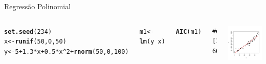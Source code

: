 \documentclass{beamer}\usepackage[]{graphicx}\usepackage[]{color}
\makeatletter
\newcommand{\hlnum}[1]{\textcolor[rgb]{0.686,0.059,0.569}{#1}}%
\newcommand{\hlopt}[1]{\textcolor[rgb]{0,0,0}{#1}}%
\newcommand{\hlstd}[1]{\textcolor[rgb]{0.345,0.345,0.345}{#1}}%
\newcommand{\hlkwb}[1]{\textcolor[rgb]{0.69,0.353,0.396}{#1}}%
\newcommand{\hlkwd}[1]{\textcolor[rgb]{0.737,0.353,0.396}{\textbf{#1}}}%
\newenvironment{kframe}{%
 \def\at@end@of@kframe{}%
 \ifinner\ifhmode%
  \def\at@end@of@kframe{\end{minipage}}%
  \begin{minipage}{\columnwidth}%
 \fi\fi%
 \def\FrameCommand##1{\hskip\@totalleftmargin \hskip-\fboxsep
 \colorbox{shadecolor}{##1}\hskip-\fboxsep
     \hskip-\linewidth \hskip-\@totalleftmargin \hskip\columnwidth}%
 \MakeFramed {\advance\hsize-\width
   \@totalleftmargin\z@ \linewidth\hsize
   \@setminipage}}%
 {\par\unskip\endMakeFramed%
 \at@end@of@kframe}
\newenvironment{knitrout}{}{} %
\renewenvironment{knitrout}{\setlength{\topsep}{0mm}}{}
\makeatother
\begin{document}
\begin{frame}[fragile]{Regressão Polinomial}

\begin{columns}

\setlength{\topsep}{2pt}

\begin{knitrout}\tiny
{}\color{fgcolor}\begin{kframe}
\begin{alltt}
\hlkwd{set.seed}\hlstd{(}\hlnum{234}\hlstd{)}
\hlstd{x} \hlkwb{<-} \hlkwd{runif}\hlstd{(}\hlnum{50}\hlstd{,}\hlnum{0}\hlstd{,}\hlnum{50}\hlstd{)}
\hlstd{y} \hlkwb{<-} \hlnum{5} \hlopt{+} \hlnum{1.3}\hlopt{*}\hlstd{x} \hlopt{+} \hlnum{0.5}\hlopt{*}\hlstd{x}\hlopt{^}\hlnum{2} \hlopt{+} \hlkwd{rnorm}\hlstd{(}\hlnum{50}\hlstd{,}\hlnum{0}\hlstd{,}\hlnum{100}\hlstd{)}

\hlstd{m1} \hlkwb{<-} \hlkwd{lm}\hlstd{(y} \hlopt{~} \hlstd{x)}

\hlkwd{AIC}\hlstd{(m1)}
\end{alltt}
\begin{verbatim}
## [1] 602.9227
\end{verbatim}
\end{kframe}
\end{knitrout}


\begin{knitrout}
\color{fgcolor}
\includegraphics[width=1\linewidth]{figure/samppolallplot-1} 

\end{knitrout}

\end{columns}

\end{frame}
\end{document}

